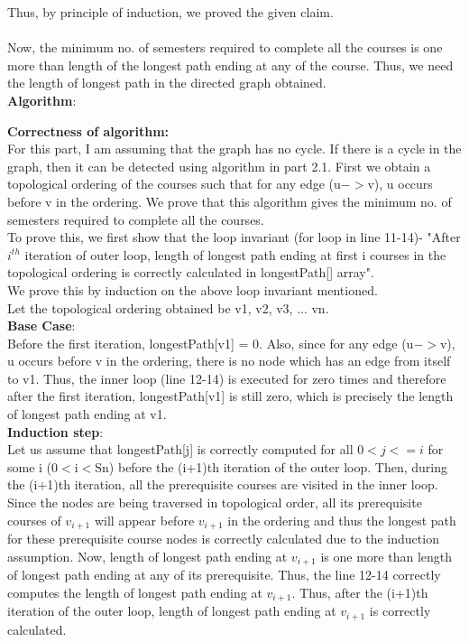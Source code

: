\documentclass{article}
\begin{document}
Thus, by principle of induction, we proved the given claim.\\
\\
Now, the minimum no. of semesters required to complete all the courses is one more than length of the longest path ending at any of the course. Thus, we need the length of longest path in the directed graph obtained.\\
\textbf{Algorithm}:

\textbf{Correctness of algorithm:}\\
For this part, I am assuming that the graph has no cycle. If there is a cycle in the graph, then it can be detected using algorithm in part 2.1. First we obtain a topological ordering of the courses such that for any edge (u$->$v), u occurs before v in the ordering. We prove that this algorithm gives the minimum no. of semesters required to complete all the courses.\\
To prove this, we first show that the loop invariant (for loop in line 11-14)- "After $i^{th}$ iteration of outer loop, length of longest path ending at first i courses in the topological ordering is correctly calculated in longestPath[] array".\\
We prove this by induction on the above loop invariant mentioned.\\
Let the topological ordering obtained be v1, v2, v3, ... vn.\\
\textbf{Base Case}:\\
Before the first iteration, longestPath[v1] = 0. Also, since for any edge (u$->$v), u occurs before v in the ordering, there is no node which has an edge from itself to v1. Thus, the inner loop (line 12-14) is executed for zero times and therefore after the first iteration, longestPath[v1] is still zero, which is precisely the length of longest path ending at v1.\\
\textbf{Induction step}:\\
Let us assume that longestPath[j] is correctly computed for all $0<j<=i$ for some i (0$<$i$<$Sn) before the (i+1)th iteration of the outer loop. Then, during the (i+1)th iteration, all the prerequisite courses are visited in the inner loop. Since the nodes are being traversed in topological order, all its prerequisite courses of $v_{i+1}$ will appear before $v_{i+1}$ in the ordering and thus the longest path for these prerequisite course nodes is correctly calculated due to the induction assumption. Now, length of longest path ending at $v_{i+1}$ is one more than length of longest path ending at any of its prerequisite. Thus, the line 12-14 correctly computes the length of longest path ending at $v_{i+1}$. Thus, after the (i+1)th iteration of the outer loop, length of longest path ending at $v_{i+1}$ is correctly calculated.\\
\end{document}
